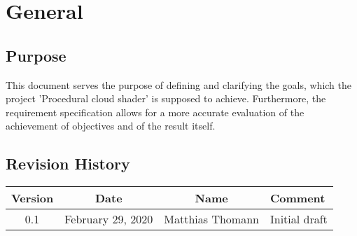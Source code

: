 \section{General}

\subsection{Purpose}
This document serves the purpose of defining and clarifying the goals, which the project 'Procedural cloud shader' is supposed to achieve. Furthermore, the requirement specification allows for a more accurate evaluation of the achievement of objectives and of the result itself.

\subsection{Revision History}

\begin{tabularx}{\textwidth}{|c|c|c|X|}
    \hline
    Version & Date & Name & Comment \\ \hline
    0.1 & February 29, 2020 & Matthias Thomann & Initial draft \\ \hline
\end{tabularx}